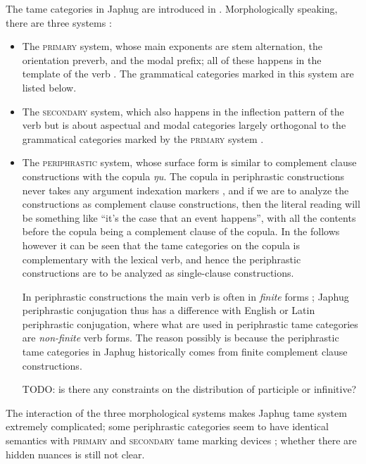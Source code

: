 \documentclass[a4paper, oneside, 12pt]{report}
\newcommand*{\citesec}[1]{\S~{#1}}
\newcommand*{\citechap}[1]{Ch~{#1}}
\newcommand*{\citetable}[1]{Table~{#1}}
\newcommand*{\citepage}[1]{p.~{#1}}
\newcommand{\form}[1]{\emph{#1}}
\newcommand{\category}[1]{\textsc{#1}}
\begin{document}
The \acs{tame} categories in Japhug 
are introduced in \citet[\citechap{21}]{jacques2021grammar}.
Morphologically speaking, there are three systems
\citep[\citepage{516}]{jacques2019egophoric}:
\begin{itemize}
    \item The \category{primary} system, 
        whose main exponents are stem alternation, the orientation preverb,
        and the modal prefix;
        all of these happens in the template of the verb \citep[\citetable{21.1}]{jacques2021grammar}.
        The grammatical categories marked in this system are listed below.
    \item The \category{secondary} system, 
        which also happens in the inflection pattern of the verb  
        but is about aspectual and modal categories 
        largely orthogonal to the grammatical categories marked by the \category{primary} system 
        \citep[\citesec{21.6}, \citesec{21.7}]{jacques2021grammar}. 
    \item The \category{periphrastic} system, 
        whose surface form is similar to complement clause constructions 
        with the copula \form{ŋu}.
        The copula in periphrastic constructions 
        never takes any argument indexation markers \citep[\citepage{1090}]{jacques2021grammar},
        and if we are to analyze the constructions as complement clause constructions,
        then the literal reading will be something like  
        ``it's the case that an event happens'',
        with all the contents before the copula 
        being a complement clause of the copula.
        In the follows however it can be seen that 
        the \acs{tame} categories on the copula 
        is complementary with the lexical verb,
        and hence the periphrastic constructions are to be analyzed 
        as single-clause constructions.

        In periphrastic constructions 
        the main verb is often in \emph{finite} forms \citep[\citepage{1081}]{jacques2021grammar};
        Japhug periphrastic conjugation thus has 
        a difference with English or Latin periphrastic conjugation,
        where what are used in periphrastic \acs{tame} categories
        are \emph{non-finite} verb forms.
        The reason possibly is because the periphrastic \acs{tame} categories in Japhug
        historically comes from finite complement clause constructions.

        TODO: is there any constraints on the distribution of participle or infinitive?
\end{itemize}
The interaction of the three morphological systems makes Japhug \acs{tame} system extremely complicated;
some periphrastic categories seem to have identical semantics with 
\category{primary} and \category{secondary} \acs{tame} marking devices \citep[\citepage{1092}]{jacques2021grammar};
whether there are hidden nuances is still not clear.
\end{document}
